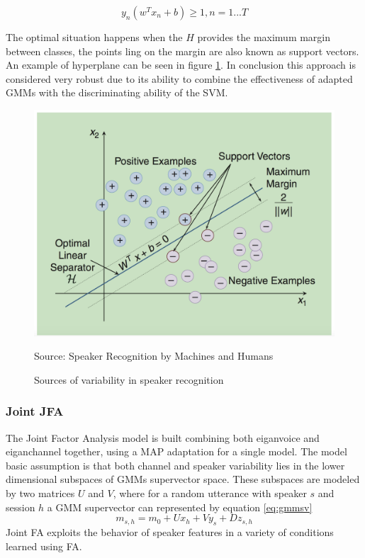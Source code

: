 \begin{equation}
    y_{n}(w^Tx_{n}+b) \geq 1,n = 1...T
\end{equation}

The optimal situation happens when the  $H$ provides the maximum
margin between classes, the points ling on the margin are also known as support vectors.
An example of hyperplane can be seen in figure \ref{fig:gmmsvm}.
In conclusion this approach is considered very robust due to its ability
to combine the effectiveness of adapted GMMs with the discriminating ability of the SVM.
\begin{figure}[h]
\caption{Sources of variability in speaker recognition}
\label{fig:gmmsvm}
\centering
\includegraphics[scale=0.20]{gmmsvm.png}
\par{Source: Speaker Recognition by Machines and Humans \cite{speaker-recognition}}

\end{figure}



\subsubsection{Joint JFA}
The Joint Factor Analysis model is built combining both
eiganvoice and eiganchannel together, using a MAP adaptation
for a single model. The model basic assumption is that both
channel and speaker variability lies in the  lower dimensional
subspaces of GMMs supervector space. These subspaces are
modeled by two matrices $U$ and $V$, where for a random
utterance with speaker $s$ and session $h$ a GMM supervector
can represented by equation \ref{eq:gmmsv}
\begin{equation} \label{eq:gmmsv}
    m_{s,h} = m_{0} + Ux_{h} + Vy_{s} + Dz_{s,h}
\end{equation}
Joint FA exploits the behavior of speaker features in a variety of
conditions learned using FA.\cite{speaker-recognition}

